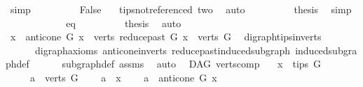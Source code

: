 \begin{isabellebody}
\ simp\isanewline
\ \ \ \ \ \ \isamarkupfalse%
\ \isamarkupfalse%
\ {\isachardoublequoteopen}False{\isachardoublequoteclose}\ \isamarkupfalse%
\ \ tips{\isacharunderscore}{\kern0pt}not{\isacharunderscore}{\kern0pt}referenced\ two\ \isamarkupfalse%
\ auto\isanewline
\ \ \ \ \ \ \isamarkupfalse%
\ \isamarkupfalse%
\ {\isacharquery}{\kern0pt}thesis\ \isamarkupfalse%
\ simp\isanewline
\ \ \ \ \isamarkupfalse%
\isanewline
\ \ \ \ \ \ \isamarkupfalse%
\ eq\isanewline
\ \ \ \ \ \ \isamarkupfalse%
\ \isamarkupfalse%
\ {\isacharquery}{\kern0pt}thesis\ \isamarkupfalse%
\ auto\isanewline
\ \ \ \ \isamarkupfalse%
\isanewline
\ \ \isamarkupfalse%
\isanewline
{}\isamarkupfalse%
\ \isanewline
\ \ \isamarkupfalse%
\ {\isachardoublequoteopen}{\isacharbraceleft}{\kern0pt}x{\isacharbraceright}{\kern0pt}\ {\isasymunion}\ anticone\ G\ x\ {\isasymunion}\ verts\ {\isacharparenleft}{\kern0pt}reduce{\isacharunderscore}{\kern0pt}past\ G\ x{\isacharparenright}{\kern0pt}\ {\isasymsubseteq}\ verts\ G{\isachardoublequoteclose}\ \isamarkupfalse%
\ digraph{\isachardot}{\kern0pt}tips{\isacharunderscore}{\kern0pt}in{\isacharunderscore}{\kern0pt}verts\ \isanewline
\ \ \ \ \ \ digraph{\isacharunderscore}{\kern0pt}axioms\ anticone{\isacharunderscore}{\kern0pt}in{\isacharunderscore}{\kern0pt}verts\ reduce{\isacharunderscore}{\kern0pt}past{\isacharunderscore}{\kern0pt}induced{\isacharunderscore}{\kern0pt}subgraph\ induced{\isacharunderscore}{\kern0pt}subgraph{\isacharunderscore}{\kern0pt}def\isanewline
\ \ \ \ \ \ subgraph{\isacharunderscore}{\kern0pt}def\ assms\ \isamarkupfalse%
\ auto\isanewline
{}\isamarkupfalse%
%
\endisatagproof
{\isafoldproof}%
%
\isadelimproof
\isanewline
%
\endisadelimproof
\isanewline
\isanewline
{}\isamarkupfalse%
\ {\isacharparenleft}{\kern0pt}\ DAG{\isacharparenright}{\kern0pt}\ verts{\isacharunderscore}{\kern0pt}comp{}{\isacharcolon}{\kern0pt}\isanewline
\ \ \ {\isachardoublequoteopen}x\ {\isasymin}\ tips\ G{\isachardoublequoteclose}\isanewline
\ \ \ \ \ {\isachardoublequoteopen}a\ {\isasymin}\ verts\ G{\isachardoublequoteclose}\isanewline
\ \ \ \ {\isachardoublequoteopen}a\ {\isacharequal}{\kern0pt}\ x{\isachardoublequoteclose}\ \isanewline
\ \ {\isacharbar}{\kern0pt}\ {\isachardoublequoteopen}a\ {\isasymin}\ anticone\ G\ x{\isachardoublequoteclose}\isanewline

\end{isabellebody}
